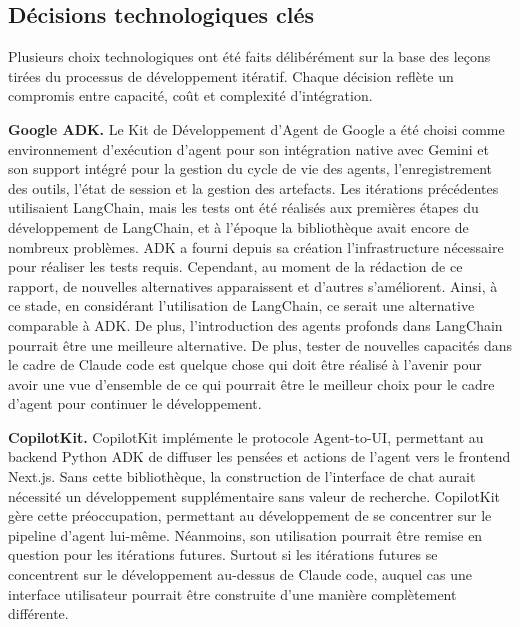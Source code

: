 \subsection{Décisions technologiques clés}
\label{subsec:technology-decisions}

Plusieurs choix technologiques ont été faits délibérément sur la base des leçons tirées du processus
de développement itératif. Chaque décision reflète un compromis entre capacité, coût et complexité
d'intégration.

\textbf{Google ADK.}
Le Kit de Développement d'Agent de Google a été choisi comme environnement d'exécution d'agent pour son
intégration native avec Gemini et son support intégré pour la gestion du cycle de vie des agents,
l'enregistrement des outils, l'état de session et la gestion des artefacts. Les itérations précédentes
utilisaient LangChain, mais les tests ont été réalisés aux premières étapes du développement de LangChain,
et à l'époque la bibliothèque avait encore de nombreux problèmes.
ADK a fourni depuis sa création l'infrastructure nécessaire pour réaliser les tests requis.
Cependant, au moment de la rédaction de ce rapport, de nouvelles alternatives apparaissent et d'autres
s'améliorent.
Ainsi, à ce stade, en considérant l'utilisation de LangChain, ce serait une alternative comparable à ADK.
De plus, l'introduction des agents profonds dans LangChain pourrait être une meilleure alternative.
De plus, tester de nouvelles capacités dans le cadre de Claude code est quelque chose qui doit être réalisé
à l'avenir pour avoir une vue d'ensemble de ce qui pourrait être le meilleur choix pour le cadre d'agent
pour continuer le développement.

\textbf{CopilotKit.}
CopilotKit implémente le protocole Agent-to-UI, permettant au backend Python ADK de diffuser
les pensées et actions de l'agent vers le frontend Next.js. Sans cette bibliothèque,
la construction de l'interface de chat aurait nécessité un développement supplémentaire sans valeur
de recherche. CopilotKit gère cette préoccupation, permettant au développement de se concentrer
sur le pipeline d'agent lui-même. Néanmoins, son utilisation pourrait être remise en question pour les
itérations futures.
Surtout si les itérations futures se concentrent sur le développement au-dessus de Claude code, auquel cas
une interface utilisateur pourrait être construite d'une manière complètement différente.

